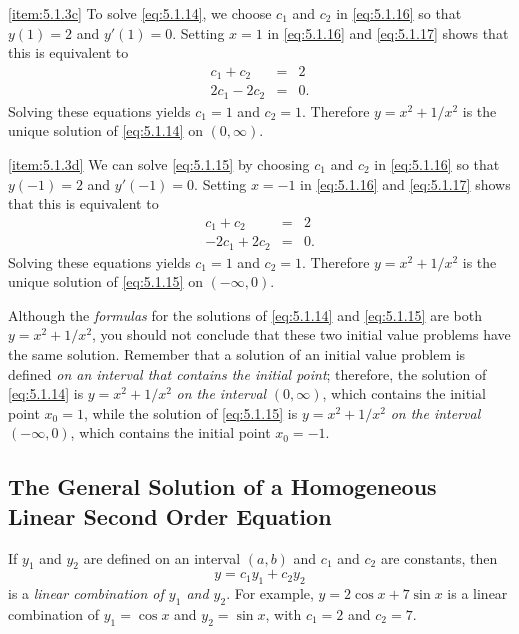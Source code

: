 \documentclass{ximera}
\begin{document}
\begin{example}
\begin{explanation}
\ref{item:5.1.3c}
To solve
\eqref{eq:5.1.14}, we choose $c_1$ and $c_2$ in \eqref{eq:5.1.16}
so that $y(1)=2$ and $y'(1)=0$. Setting $x=1$ in \eqref{eq:5.1.16}
and \eqref{eq:5.1.17} shows that this is equivalent to
\begin{eqnarray*}
c_1+c_2&=&2\\
2c_1-2c_2&=&0.
\end{eqnarray*}
Solving these equations yields  $c_1=1$  and $c_2=1$.
Therefore $y=x^2+1/x^2$ is the unique  solution of \eqref{eq:5.1.14}
on $(0,\infty)$.
 
\ref{item:5.1.3d}
We can solve
\eqref{eq:5.1.15} by choosing $c_1$ and $c_2$ in \eqref{eq:5.1.16}
so that $y(-1)=2$ and $y'(-1)=0$. Setting $x=-1$ in \eqref{eq:5.1.16}
and \eqref{eq:5.1.17} shows that this is equivalent to
\begin{eqnarray*}
c_1+c_2&=&2\\
-2c_1+2c_2&=&0.
\end{eqnarray*}
Solving these equations yields  $c_1=1$  and $c_2=1$.
Therefore $y=x^2+1/x^2$ is the unique solution of \eqref{eq:5.1.15}
on $(-\infty,0)$.
 
\end{explanation}
\end{example}
 
 
 
Although the \textit{formulas} for the solutions of \eqref{eq:5.1.14} and
\eqref{eq:5.1.15} are both $y=x^2+1/x^2$, you should not conclude that
these two initial value problems have the same solution. Remember that
a solution of an initial value problem is defined \textit{on an interval
that contains the initial point};  therefore, the solution of
\eqref{eq:5.1.14} is $y=x^2+1/x^2$ \textit{on the interval} $(0,\infty)$,
which contains the initial point $x_0=1$, while the solution of
\eqref{eq:5.1.15} is $y=x^2+1/x^2$ \textit{on the interval} $(-\infty,0)$,
which contains the initial point $x_0=-1$.
 
\subsection*{The General Solution of a Homogeneous Linear Second Order
Equation}
 
If $y_1$ and $y_2$ are defined on an interval
$(a,b)$ and $c_1$ and $c_2$ are constants, then
$$
y=c_1y_1+c_2y_2
$$
is a \textit{linear combination of $y_1$ and $y_2$}. For
example, $y=2\cos x+7 \sin x$ is a linear combination of $y_1=
\cos x$ and $y_2=\sin x$, with $c_1=2$ and $c_2=7$.
 
\end{document}
